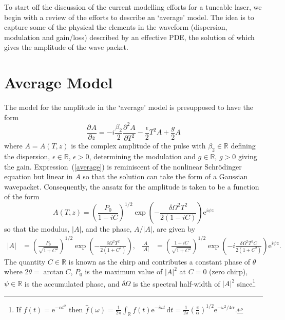 \documentclass[12pt]{article}
\title{}
\author{Brady Metherall \& C.\ Sean Bohun}
\providecommand{\df}{\textrm{d}}
\newcommand{\pdiff}[3][]{\frac{\partial^{#1}#2}{\partial{#3}^{#1}}}
\begin{document}
\maketitle

\noindent
To start off the discussion of the current modelling efforts for a tuneable laser, we begin with a review of the efforts to describe an `average' model. The idea is to capture some of the physical the elements in the waveform (dispersion, modulation and gain/loss) described by an effective PDE, the solution of which gives the amplitude of the wave packet.

\section{Average Model}
The model for the amplitude in the `average' model is presupposed to have the form
\begin{equation}
\label{average}
	\pdiff{A}{z} = -i\frac{\beta_2}{2}\pdiff[2]{A}{T} - \frac{\epsilon}{2}T^2 A + \frac{g}{2}A
\end{equation}
where $A=A(T,z)$ is the complex amplitude of the pulse with $\beta_2 \in \mathbb{R}$ defining the dispersion, $\epsilon \in \mathbb{R}$, $\epsilon > 0$, determining the modulation and $g \in \mathbb{R}$, $g > 0$ giving the gain. Expression~(\ref{average}) is reminiscent of the nonlinear Schr\"odinger equation but linear in $A$ so that the solution can take the form of a Gaussian wavepacket. Consequently, the ansatz for the amplitude is taken to be a function of the form
\begin{equation}
\label{ansatz}
	A(T,z) = \left(\frac{P_0}{1-i C}\right)^{1/2}\exp
	\left(-\frac{\delta \Omega^2 T^2}{2(1-i C)}\right)\textrm{e}^{i\psi z}
\end{equation}
so that the modulus, $|A|$, and the phase, $A/|A|$, are given by
\begin{align*}
	\left|A\right| &= \left(\frac{P_0}{\sqrt{1 + C^2}}\right)^{1/2}
	\exp\left(-\frac{\delta \Omega^2 T^2}{2(1 + C^2)}\right),&
	\frac{A}{|A|} &= \left(\frac{1+iC}{\sqrt{1+C^2}}\right)^{1/2}\exp
	\left(-i\frac{\delta \Omega^2 T^2 C}{2(1+C^2)}\right)\textrm{e}^{i\psi z}.
\end{align*}
The quantity $C \in \mathbb{R}$ is known as the chirp and contributes a constant phase of $\theta$ where $2\theta = \arctan C$, $P_0$ is the maximum value of $|A|^2$ at $C=0$ (zero chirp), $\psi \in \mathbb{R}$ is the accumulated phase, and $\delta\Omega$ is the spectral half-width of $|A|^2$ since\footnote{If $f(t) = \textrm{e}^{-\alpha t^2}$ then $\hat{f}(\omega) = \frac{1}{2\pi}\int_{\mathbb{R}} f(t)\textrm{e}^{-i\omega t}\, \df t = \frac{1}{2\pi} (\frac{\pi}{\alpha})^{1/2}\textrm{e}^{-\omega^2/4\alpha}$.}
\end{document}
